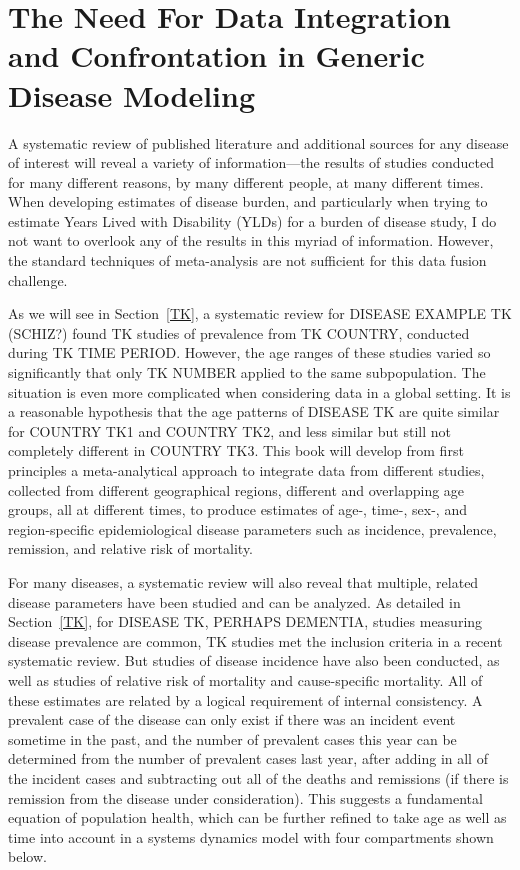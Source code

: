 \section[Need for Confrontation]{The Need For Data Integration and Confrontation in Generic Disease Modeling}

A systematic review of published literature and additional sources for
any disease of interest will reveal a variety of information---the
results of studies conducted for many different reasons, by many
different people, at many different times. When developing estimates
of disease burden, and particularly when trying to estimate Years
Lived with Disability (YLDs) for a burden of disease study, I do not
want to overlook any of the results in this myriad of
information. However, the standard techniques of meta-analysis are
not sufficient for this data fusion challenge.

As we will see in Section~\ref{TK}, a systematic review for DISEASE
EXAMPLE TK (SCHIZ?) found TK studies of prevalence from TK COUNTRY,
conducted during TK TIME PERIOD.  However, the age ranges of these
studies varied so significantly that only TK NUMBER applied to the
same subpopulation.  The situation is even more complicated when
considering data in a global setting. It is a reasonable hypothesis
that the age patterns of DISEASE TK are quite similar for COUNTRY TK1
and COUNTRY TK2, and less similar but still not completely different
in COUNTRY TK3. This book will develop from first principles a
meta-analytical approach to integrate data from different studies,
collected from different geographical regions, different and
overlapping age groups, all at different times, to produce estimates
of age-, time-, sex-, and region-specific epidemiological disease
parameters such as incidence, prevalence, remission, and relative risk
of mortality.

For many diseases, a systematic review will also reveal that multiple,
related disease parameters have been studied and can be analyzed. As
detailed in Section~\ref{TK}, for DISEASE TK, PERHAPS DEMENTIA,
studies measuring disease prevalence are common, TK studies met the
inclusion criteria in a recent systematic review. But studies of
disease incidence have also been conducted, as well as studies of
relative risk of mortality and cause-specific mortality. All of these
estimates are related by a logical requirement of internal
consistency.  A prevalent case of the disease can only exist if there
was an incident event sometime in the past, and the number of
prevalent cases this year can be determined from the number of
prevalent cases last year, after adding in all of the incident cases
and subtracting out all of the deaths and remissions (if there is
remission from the disease under consideration).  This suggests a
fundamental equation of population health, which can be further
refined to take age as well as time into account in a systems dynamics
model with four compartments shown below.

